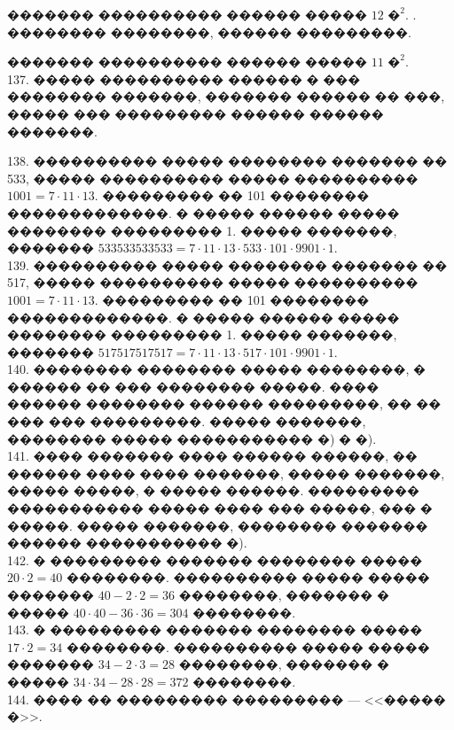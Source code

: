 \documentclass[12pt]{article}
\begin{document}
������� ���������� ������ ����� $12\text{ �}^2.$
\newpage{}. �������� ��������, ������ ���������.
\begin{center}
\begin{figure}[ht!]
\end{figure}
\end{center}
������� ���������� ������ ����� $11\text{ �}^2.$\\
137. ����� ���������� ������ � ��� �������� �������, ������� ������ �� ���, ����� ��� ��������� ������ ������ �������.
\begin{center}
\begin{figure}[ht!]
\end{figure}
\end{center}
138. ���������� ����� �������� ������� �� 533, ����� ���������� ����� ���������� $1001=7\cdot11\cdot13.$ ��������� �� 101 �������� �������������. � ����� ������ ����� �������� ��������� 1. ����� �������, ������� $533533533533=7\cdot11\cdot13\cdot533\cdot101\cdot9901\cdot1.$\\
139. ���������� ����� �������� ������� �� 517, ����� ���������� ����� ���������� $1001=7\cdot11\cdot13.$ ��������� �� 101 �������� �������������. � ����� ������ ����� �������� ��������� 1. ����� �������, ������� $517517517517=7\cdot11\cdot13\cdot517\cdot101\cdot9901\cdot1.$\\
140. �������� �������� ����� ��������, � ������ �� ��� �������� �����. ���� ������ �������� ������ ���������, �� �� ��� ��� ���������. ����� �������, �������� ����� ����������� �) � �).\\
141. ���� ������� ���� ������ ������, �� ������ ���� ���� �������, ����� �������, ����� �����, � ����� ������. ��������� ����������� ����� ���� ��� �����, ��� � �����. ����� �������, �������� ������� ������ ����������� �).\\
142. � ��������� ������� �������� ����� $20\cdot2=40$ ��������. ���������� ����� ����� ������� $40-2\cdot2=36$ ��������, ������� � ����� $40\cdot40-36\cdot36=304$ ��������.\\
143. � ��������� ������� �������� ����� $17\cdot2=34$ ��������. ���������� ����� ����� ������� $34-2\cdot3=28$ ��������, ������� � ����� $34\cdot34-28\cdot28=372$ ��������.\\
144. ���� �� ��������� ��������� --- <<����� �>>.
\begin{center}
\begin{figure}[ht!]
\end{figure}
\end{center}\newpage\noindent
\end{document}

